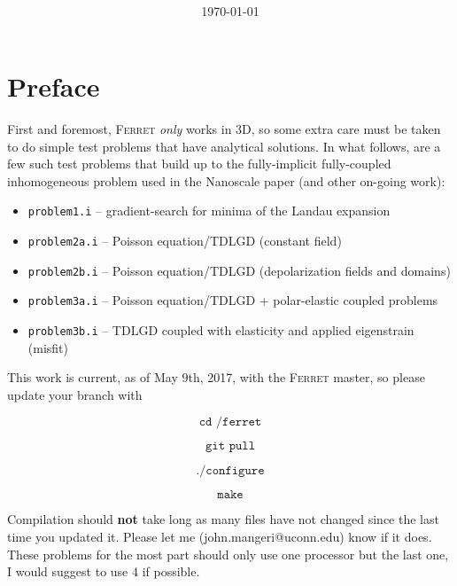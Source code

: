 \documentclass[paper=a4, fontsize=14pt]{scrartcl} %
\title{	
\normalfont \normalsize 
\textsc{} \\ [25pt]                                    %
\horrule{0.5pt} \\[0.1cm] %
\horrule{2pt} \\[0.7cm] %
}
\author{} %
\date{\normalsize\today} %
\numberwithin{equation}{section} %
\numberwithin{figure}{section} %
\numberwithin{table}{section} %
\begin{document}


\newpage

\section*{}

\section*{Preface}

First and foremost, \textsc{Ferret} \emph{only} works in 3D, so some extra care must be taken to do simple test problems that have analytical solutions. In what follows, are a few such test problems that build up to the fully-implicit fully-coupled inhomogeneous problem used in the Nanoscale paper (and other on-going work):

\begin{itemize}
\item \texttt{problem1.i} -- gradient-search for minima of the Landau expansion
\item \texttt{problem2a.i} -- Poisson equation/TDLGD (constant field)
\item \texttt{problem2b.i} -- Poisson equation/TDLGD (depolarization fields and domains)
\item \texttt{problem3a.i} -- Poisson equation/TDLGD + polar-elastic coupled problems
\item \texttt{problem3b.i} -- TDLGD coupled with elasticity and applied eigenstrain (misfit)
\end{itemize}

This work is current, as of May 9th, 2017, with the \textsc{Ferret} master, so please update your branch with 

$$\texttt{cd /ferret}$$

\vspace*{-12pt}

$$\texttt{git pull}$$

\vspace*{-12pt}

$$\texttt{./configure}$$

\vspace*{-12pt}

$$\texttt{make}$$

Compilation should \textbf{not} take long as many files have not changed since the last time you updated it. Please let me (john.mangeri@uconn.edu) know if it does. These problems for the most part should only use one processor but the last one, I would suggest to use 4 if possible.
\end{document}
